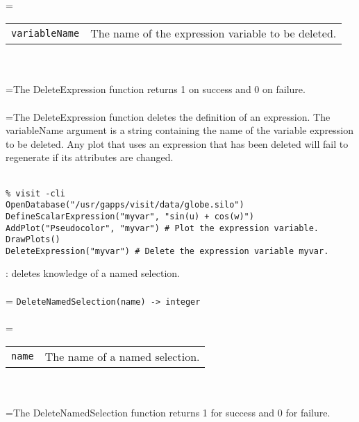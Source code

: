 \documentclass[10pt,a4paper]{report}
\begin{document}
 \\ 
\hangindent=\parindent 
\begin{tabular}{lp{9cm}}
\verb!variableName! & The name of the expression variable to be deleted. \\
\end{tabular} \\[-2mm]


 \\ 
\hangindent=\parindent The DeleteExpression function returns 1 on success and 0 on failure. \\[-3mm] 

 \\ 
\hangindent=\parindent The DeleteExpression function deletes the definition of an expression. The variableName argument is a string containing the name of the variable expression to be deleted. Any plot that uses an expression that has been deleted will fail to regenerate if its attributes are changed. \\[-3mm] 

\\[-6mm]
\begin{verbatim}% visit -cli
OpenDatabase("/usr/gapps/visit/data/globe.silo")
DefineScalarExpression("myvar", "sin(u) + cos(w)")
AddPlot("Pseudocolor", "myvar") # Plot the expression variable.
DrawPlots()
DeleteExpression("myvar") # Delete the expression variable myvar.
\end{verbatim}
\newpage


{}
: deletes knowledge of a named selection.\\[-3mm]

 \\ 
\hangindent=\parindent 
\verb!DeleteNamedSelection(name) -> integer!\\ [-3mm]

 \\ 
\hangindent=\parindent 
\begin{tabular}{ll}
\verb!name! & The name of a named selection. \\
\end{tabular} \\[-2mm]


 \\ 
\hangindent=\parindent The DeleteNamedSelection function returns 1 for success and 0 for failure. \\[-3mm] 
\end{document}
